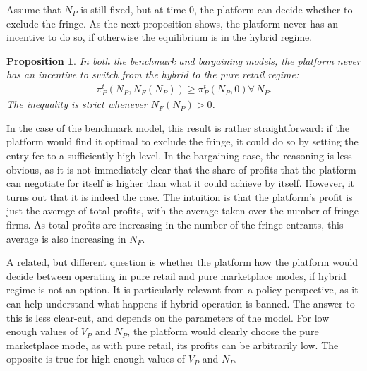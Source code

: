 \documentclass[a4paper]{article}
\newtheorem{proposition}{Proposition}
\begin{document}
Assume that $N_P$ is still fixed, but at time 0, the platform can decide whether to exclude the fringe.
As the next proposition shows, the platform never has an incentive to do so, if otherwise the equilibrium is in the hybrid regime.
\begin{proposition}
    \label{prop:hybrid_vs_retail}
    In both the benchmark and bargaining models, the platform never has an incentive to switch from the hybrid to the pure retail regime:
    \begin{align*}
        \pi_P^t(N_P, N_F(N_P)) \geq \pi_P^t(N_P, 0) \forall\, N_P.
    \end{align*}
    The inequality is strict whenever $N_F(N_P) > 0$.
\end{proposition}
In the case of the benchmark model, this result is rather straightforward: if the platform would find it optimal to exclude the fringe, it could do so by setting the entry fee to a sufficiently high level.
In the bargaining case, the reasoning is less obvious, as it is not immediately clear that the share of profits that the platform can negotiate for itself is higher than what it could achieve by itself.
However, it turns out that it is indeed the case.
The intuition is that the platform's profit is just the average of total profits, with the average taken over the number of fringe firms.
As total profits are increasing in the number of the fringe entrants, this average is also increasing in $N_F$.

A related, but different question is whether the platform how the platform would decide between operating in pure retail and pure marketplace modes, if hybrid regime is not an option.
It is particularly relevant from a policy perspective, as it can help understand what happens if hybrid operation is banned.
The answer to this is less clear-cut, and depends on the parameters of the model.
For low enough values of $V_P$ and $N_P$, the platform would clearly choose the pure marketplace mode, as with pure retail, its profits can be arbitrarily low.
The opposite is true for high enough values of $V_P$ and $N_P$.
\end{document}
